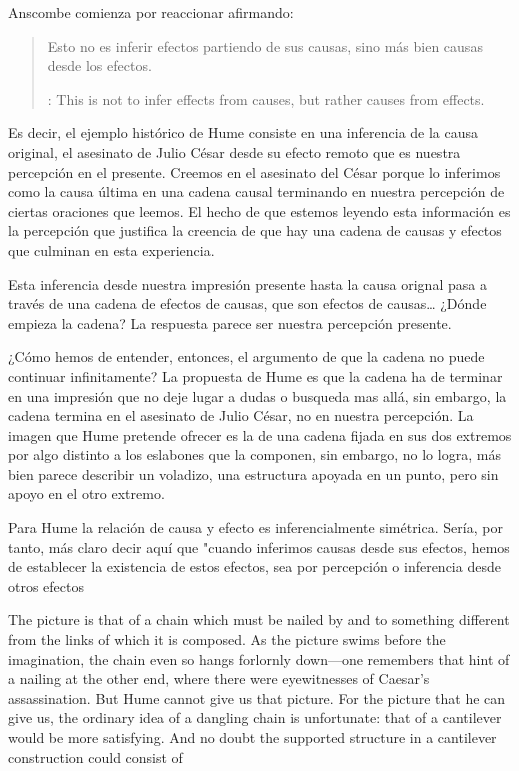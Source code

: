 Anscombe comienza por reaccionar afirmando:
\blockquote[{\cite[86]{anscombe1981hjc}}: This is not to infer effects from
causes, but rather causes from effects.]{Esto no es inferir efectos partiendo de
  sus causas, sino más bien causas desde los efectos.} Es decir, el ejemplo
histórico de Hume consiste en una inferencia de la causa original, el asesinato
de Julio César desde su efecto remoto que es nuestra percepción en el presente.
Creemos en el asesinato del César porque lo inferimos como la causa última en
una cadena causal terminando en nuestra percepción de ciertas oraciones que
leemos. El hecho de que estemos leyendo esta información es la percepción que
justifica la creencia de que hay una cadena de causas y efectos que culminan en
esta experiencia.

Esta inferencia desde nuestra impresión presente hasta la causa orignal pasa a
través de una cadena de efectos de causas, que son efectos de causas\ldots
¿Dónde empieza la cadena? La respuesta parece ser nuestra percepción presente.

¿Cómo hemos de entender, entonces, el argumento de que la cadena no puede
continuar infinitamente? La propuesta de Hume es que la cadena ha de terminar en
una impresión que no deje lugar a dudas o busqueda mas allá, sin embargo, la
cadena termina en el asesinato de Julio César, no en nuestra percepción. La
imagen que Hume pretende ofrecer es la de una cadena fijada en sus dos extremos
por algo distinto a los eslabones que la componen, sin embargo, no lo logra, más
bien parece describir un voladizo, una estructura apoyada en un punto, pero sin
apoyo en el otro extremo.



Para Hume la relación de causa y efecto es inferencialmente simétrica. Sería,
por tanto, más claro decir aquí que "cuando inferimos causas desde sus efectos,
hemos de establecer la existencia de estos efectos, sea por percepción o
inferencia desde otros efectos

The picture is that of a chain which must be nailed by and to something
different from the links of which it is composed. As the picture swims before
the imagination, the chain even so hangs forlornly down—one remembers that hint
of a nailing at the other end, where there were eyewitnesses of Caesar’s
assassination. But Hume cannot give us that picture. For the picture that he can
give us, the ordinary idea of a dangling chain is unfortunate: that of a
cantilever would be more satisfying. And no doubt the supported structure in a
cantilever construction could consist of

